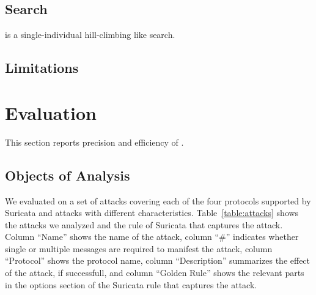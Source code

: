\documentclass[runningheads]{llncs}
\begin{document}
\subsection{Search}

\tname{} is a single-individual hill-climbing like search.


\subsection{Limitations}


\section{Evaluation}



This section reports precision and efficiency of \tname.


\subsection{Objects of Analysis}

We evaluated \tname{} on a set of attacks covering each of the four
protocols supported by Suricata and attacks with different
characteristics. Table~\ref{table:attacks} shows the attacks we
analyzed and the rule of Suricata that captures the attack. Column
``Name'' shows the name of the attack, column ``\#'' indicates whether
single or multiple messages are required to manifest the attack,
column ``Protocol'' shows the protocol name, column ``Description''
summarizes the effect of the attack, if successfull, and column
``Golden Rule'' shows the relevant parts in the options section of the
Suricata rule that captures the attack.
\end{document}
